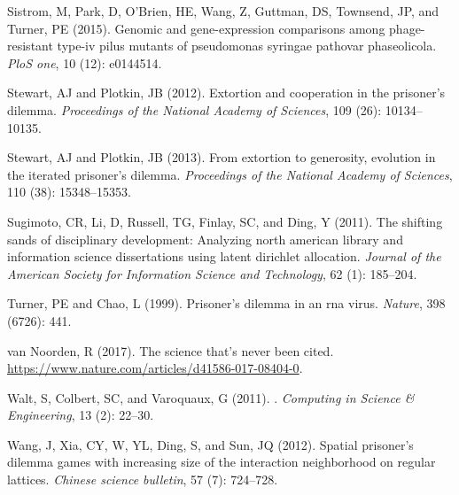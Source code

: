 \documentclass{article}
\theoremstyle{definition}
\begin{document}
\begin{thebibliography}{71}
    Sistrom, M, Park, D, O’Brien, HE, Wang, Z, Guttman, DS, Townsend, JP, and
      Turner, PE (2015).
    \newblock Genomic and gene-expression comparisons among phage-resistant type-iv
      pilus mutants of pseudomonas syringae pathovar phaseolicola.
    \newblock \emph{PloS one}, 10 (12): e0144514.
    
    Stewart, AJ and Plotkin, JB (2012).
    \newblock Extortion and cooperation in the prisoner’s dilemma.
    \newblock \emph{Proceedings of the National Academy of Sciences}, 109
      (26): 10134--10135.
    
    Stewart, AJ and Plotkin, JB (2013).
    \newblock From extortion to generosity, evolution in the iterated prisoner’s
      dilemma.
    \newblock \emph{Proceedings of the National Academy of Sciences}, 110
      (38): 15348--15353.
    
    Sugimoto, CR, Li, D, Russell, TG, Finlay, SC, and Ding, Y (2011).
    \newblock The shifting sands of disciplinary development: Analyzing north
      american library and information science dissertations using latent dirichlet
      allocation.
    \newblock \emph{Journal of the American Society for Information Science and
      Technology}, 62 (1): 185--204.
    
    Turner, PE and Chao, L (1999).
    \newblock Prisoner's dilemma in an rna virus.
    \newblock \emph{Nature}, 398 (6726): 441.
    
    van Noorden, R (2017).
    \newblock The science that’s never been cited.
    \newblock \url{https://www.nature.com/articles/d41586-017-08404-0}.
    
    Walt, S, Colbert, SC, and Varoquaux, G (2011).
    .
    \newblock \emph{Computing in Science \& Engineering}, 13 (2):
      22--30.
    
    Wang, J, Xia, CY, W, YL, Ding, S, and Sun, JQ (2012).
    \newblock Spatial prisoner’s dilemma games with increasing size of the
      interaction neighborhood on regular lattices.
    \newblock \emph{Chinese science bulletin}, 57 (7): 724--728.
    

\end{thebibliography}
\end{document}
